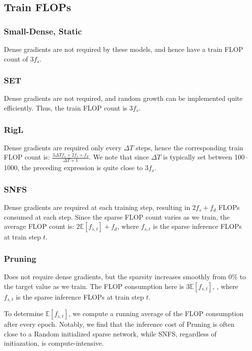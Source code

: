 \subsection{Train FLOPs}

\subsubsection{Small-Dense, Static} Dense gradients are not required by these models, and hence have a train FLOP count of $3f_s$.

\subsubsection{SET} Dense gradients are not required, and random growth can be implemented quite efficiently. Thus, the train FLOP count is $3f_s$.

\subsubsection{RigL} Dense gradients are required only every $\Delta T$ steps, hence the corresponding train FLOP count is: $\frac{3\Delta Tf_s + 2f_s + f_d }{\Delta T + 1}$. We note that since $\Delta T$ is typically set between 100--1000, the preceding expression is quite close to $3f_s$.

\subsubsection{SNFS} Dense gradients are required at each training step, resulting in $2f_s + f_d$ FLOPs consumed at each step. Since the sparse FLOP count varies as we train, the average FLOP count is: $2\mathbb{E}[f_{s,t}] + f_d$, where $f_{s,t}$ is the sparse inference FLOPs at train step $t$.

\subsubsection{Pruning} Does not require dense gradients, but the sparsity increases smoothly from $0\%$ to the target value as we train. The FLOP consumption here is $3\mathbb{E}[f_{s,t}]$, , where $f_{s,t}$ is the sparse inference FLOPs at train step $t$.

To determine $\mathbb{E}[f_{s,t}]$, we compute a running average of the FLOP consumption after every epoch. Notably, we find that the inference cost of Pruning is often close to a Random initialized sparse network, while SNFS, regardless of initiazation, is compute-intensive.